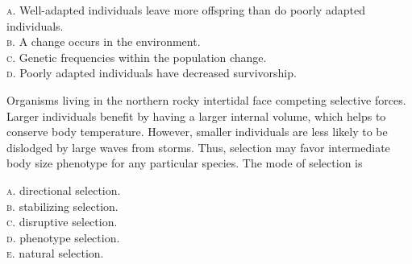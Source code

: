 \documentclass[letterpaper]{tufte-handout}
\begin{document}
\smallskip

\noindent \textsc{a}. Well-adapted individuals leave more offspring than do poorly adapted individuals.\\
\noindent \textsc{b}. A change occurs in the environment.\\
\noindent \textsc{c}. Genetic frequencies within the population change.\\
\noindent \textsc{d}. Poorly adapted individuals have decreased survivorship.\\

\bigskip

\noindent Organisms living in the northern rocky intertidal face competing selective forces. Larger individuals benefit by having a larger internal volume, which helps to conserve body temperature. However, smaller individuals are less likely to be dislodged by large waves from storms. Thus, selection may favor intermediate body size phenotype for any particular species. The mode of selection is

\smallskip

\textsc{a}. directional selection.\\
\textsc{b}. stabilizing selection. \\
\textsc{c}. disruptive selection. \\
\textsc{d}. phenotype selection. \\
\textsc{e}. natural selection.

%
%
\end{document}

